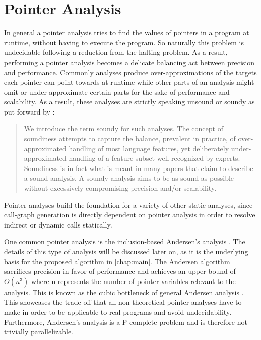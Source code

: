 \section{Pointer Analysis}\label{sec:pta}
In general a pointer analysis tries to find the values of pointers in a program at runtime, without having to execute the program.
So naturally this problem is undecidable \cite{landi1992undecidability} following a reduction from the halting problem.
As a result, performing a pointer analysis becomes a delicate balancing act between precision and performance.
Commonly analyses produce over-approximations of the targets each pointer can point towards at runtime while other parts of an analysis might omit or under-approximate certain parts for the sake of performance and scalability.
As a result, these analyses are strictly speaking unsound or soundy as put forward by \cite{livshits2015defense}:

\begin{quote}
    We introduce the term soundy for
    such analyses. The concept of soundiness
    attempts to capture the balance,
    prevalent in practice, of over-approximated
    handling of most language features, yet deliberately
    under-approximated handling of a feature subset well
    recognized by experts. Soundiness is in
    fact what is meant in many papers that
    claim to describe a sound analysis. A
    soundy analysis aims to be as sound as
    possible without excessively compromising
    precision and/or scalability.
\end{quote}

Pointer analyses build the foundation for a variety of other static analyses, since call-graph generation is directly dependent on pointer analysis in order to resolve indirect or dynamic calls statically.

One common pointer analysis is the inclusion-based Andersen's analysis \cite{andersen1994program}. The details of this type of analysis will be discussed later on, as it is the underlying basis for the proposed algorithm in \autoref{chap:main}. The Andersen algorithm sacrifices precision in favor of performance and achieves an upper bound of $O(n^3)$ where n represents the number of pointer variables relevant to the analysis. This is known as the cubic bottleneck of general Andersen analysis \cite{mathiasen2021fine}.
This showcases the trade-off that all non-theoretical pointer analyses have to make in order to be applicable to real programs and avoid undecidability. Furthermore, Andersen's analysis is a P-complete problem and is therefore not trivially parallelizable.

